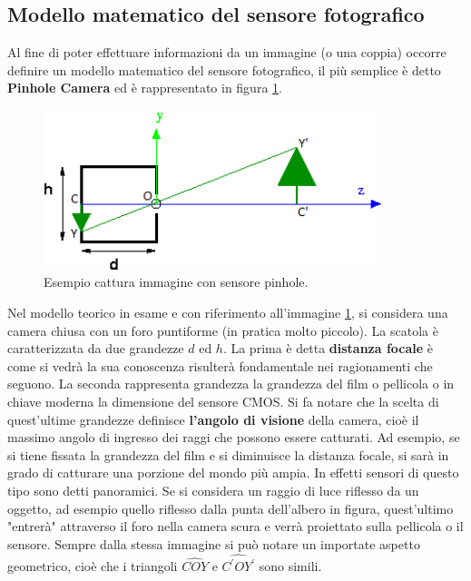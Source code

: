 \subsection{Modello matematico del sensore fotografico}
\label{sec:stereo:modello}
Al fine di poter effettuare informazioni da un immagine (o una coppia) occorre definire un modello matematico del sensore fotografico, il più semplice è detto \textbf{Pinhole Camera} ed è rappresentato in figura \ref{vis:stereo:pinhole}.
\begin{figure}[h!]
	\centering
	\includegraphics[width=280pt]{imgs/pinhole-and-tree2.png}
	\caption{Esempio cattura immagine con sensore pinhole.}
	\label{vis:stereo:pinhole}
\end{figure} 
Nel modello teorico in esame e con riferimento all'immagine \ref{vis:stereo:pinhole}, si considera una camera chiusa con un foro puntiforme (in pratica molto piccolo). La scatola è caratterizzata da due grandezze $d$ ed $h$. La prima è detta \textbf{distanza focale} è come si vedrà la sua conoscenza risulterà fondamentale nei ragionamenti che seguono. La seconda rappresenta grandezza la grandezza del film o pellicola o in chiave moderna la dimensione del sensore CMOS. Si fa notare che la scelta di quest'ultime grandezze definisce \textbf{l'angolo di visione} della camera, cioè il massimo angolo di ingresso dei raggi che possono essere catturati. Ad esempio, se si tiene fissata la grandezza del film e si diminuisce la distanza focale, si sarà in grado di catturare una porzione del mondo più ampia. In effetti sensori di questo tipo sono detti panoramici.
Se si considera un raggio di luce riflesso da un oggetto, ad esempio quello riflesso dalla punta dell'albero in figura, quest'ultimo "entrerà" attraverso il foro nella camera scura e verrà proiettato sulla pellicola o il sensore. Sempre dalla stessa immagine si può notare un importate aspetto geometrico, cioè che i triangoli $\widehat{COY}$ e $\widehat{C^{'}OY^{'}}$ sono simili.

